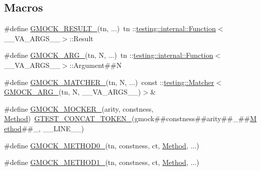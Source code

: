 \subsection*{Macros}
\begin{DoxyCompactItemize}
\item 
\#define \hyperlink{gmock-generated-function-mockers_8h_a0e9d94e9c77df84f1103af06feee1077}{G\+M\+O\+C\+K\+\_\+\+R\+E\+S\+U\+L\+T\+\_\+}(tn, ...)~tn \+::\hyperlink{structtesting_1_1internal_1_1Function}{testing\+::internal\+::\+Function}$<$\+\_\+\+\_\+\+V\+A\+\_\+\+A\+R\+G\+S\+\_\+\+\_\+$>$\+::Result
\item 
\#define \hyperlink{gmock-generated-function-mockers_8h_a887575cc1c31158fba808180a10c004f}{G\+M\+O\+C\+K\+\_\+\+A\+R\+G\+\_\+}(tn,  N, ...)~tn \+::\hyperlink{structtesting_1_1internal_1_1Function}{testing\+::internal\+::\+Function}$<$\+\_\+\+\_\+\+V\+A\+\_\+\+A\+R\+G\+S\+\_\+\+\_\+$>$\+::Argument\#\#N
\item 
\#define \hyperlink{gmock-generated-function-mockers_8h_aa87d0009fe91f1c89d658776b55a769c}{G\+M\+O\+C\+K\+\_\+\+M\+A\+T\+C\+H\+E\+R\+\_\+}(tn,  N, ...)~const \+::\hyperlink{classtesting_1_1Matcher}{testing\+::\+Matcher}$<$\hyperlink{gmock-generated-function-mockers_8h_a887575cc1c31158fba808180a10c004f}{G\+M\+O\+C\+K\+\_\+\+A\+R\+G\+\_\+}(tn, N, \+\_\+\+\_\+\+V\+A\+\_\+\+A\+R\+G\+S\+\_\+\+\_\+)$>$\&
\item 
\#define \hyperlink{gmock-generated-function-mockers_8h_a7d362499e27b1bc3a9806dd3cf58a5b7}{G\+M\+O\+C\+K\+\_\+\+M\+O\+C\+K\+E\+R\+\_\+}(arity,  constness,  \hyperlink{gmock-spec-builders__test_8cc_a95606368148f3e5aab5db46c32466afd}{Method})~\hyperlink{gtest-internal_8h_ae3c336cbe1ae2bd1b1d019333e4428a0}{G\+T\+E\+S\+T\+\_\+\+C\+O\+N\+C\+A\+T\+\_\+\+T\+O\+K\+E\+N\+\_\+}(gmock\#\#constness\#\#arity\#\#\+\_\+\#\#\hyperlink{gmock-spec-builders__test_8cc_a95606368148f3e5aab5db46c32466afd}{Method}\#\#\+\_\+, \+\_\+\+\_\+\+L\+I\+N\+E\+\_\+\+\_\+)
\item 
\#define \hyperlink{gmock-generated-function-mockers_8h_ae0d290ffa58d7c624b2e3487ba1252f4}{G\+M\+O\+C\+K\+\_\+\+M\+E\+T\+H\+O\+D0\+\_\+}(tn,  constness,  ct,  \hyperlink{gmock-spec-builders__test_8cc_a95606368148f3e5aab5db46c32466afd}{Method}, ...)
\item 
\#define \hyperlink{gmock-generated-function-mockers_8h_a1bc0012d62440dda77208dabdf4925c9}{G\+M\+O\+C\+K\+\_\+\+M\+E\+T\+H\+O\+D1\+\_\+}(tn,  constness,  ct,  \hyperlink{gmock-spec-builders__test_8cc_a95606368148f3e5aab5db46c32466afd}{Method}, ...)
\item 

\end{DoxyCompactItemize}
